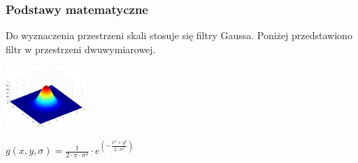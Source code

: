 \begin{frame}
\frametitle{Podstawy matematyczne}
Do wyznaczenia przestrzeni skali stosuje się filtry Gaussa. Poniżej przedstawiono filtr w przestrzeni dwuwymiarowej.

\begin{center}
\includegraphics[width=3cm]{gaussian2d.png}

$ g(x,y,\sigma)= \frac{1}{2 \cdot \pi \cdot \sigma ^ {2} }\cdot e^{(-\frac{x^{2} + y^{2}}{2 \cdot \sigma ^{2}})} $
\end{center}
\end{frame}
